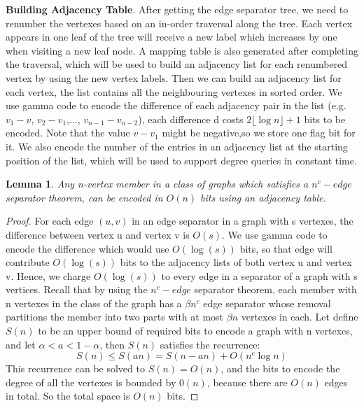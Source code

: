 \documentclass[12pt,glossary]{dalthesis}
\newtheorem{lemma}[theorem]{Lemma}
\begin{document}
\textbf{Building Adjacency Table}. After getting the edge separator tree, we need to renumber the vertexes based on an in-order traversal along the tree. Each vertex appears in one leaf of the tree will receive a new label which increases by one when visiting a new leaf node. A mapping table is also generated after completing the traversal, which will be used to build an adjacency list for each renumbered vertex by using the new vertex labels. Then we can build an adjacency list for each vertex, the list contains all the neighbouring vertexes in sorted order. We use gamma code to encode the difference of each adjacency pair in the list (e.g. $v_{1} - v$, $v_{2} - v_{1}$,..., $v_{n-1} - v_{n-2}$), each difference d costs $2\lfloor \log n \rfloor + 1$ bits to be encoded. Note that the value $v -v_{1}$ might be negative,so we store one flag bit for it. We also encode the number of the entries in an adjacency list at the starting position of the list, which will be used to support degree queries in constant time.

\begin{lemma}
Any n-vertex member in a class of graphs which satisfies a $n^{c}-edge$ separator
theorem, can be encoded in $O(n)$ bits using an adjacency table.
\end{lemma}
 
\begin{proof}
For each edge $(u, v)$ in an edge separator in a graph with s vertexes, the difference
between vertex u and vertex v is $O(s)$. We use gamma code to encode the difference which would use $O(\log (s))$ bits, so that edge will contribute $O(\log (s))$ bits to the adjacency lists of both vertex u and vertex v. Hence, we charge $O(\log (s))$ to every edge in a separator of a graph with s vertices. Recall that by using the $n^{c}- edge$ separator theorem, each member with n vertexes in the class of the graph has a $\beta n^{c}$ edge separator whose removal partitions the member into two parts with at most $\beta n$ vertexes in each. Let define $S(n)$ to be an upper bound of required bits to encode a graph with n vertexes, and let $\alpha < a < 1 - \alpha $, then $S(n)$ satisfies the recurrence:
\[ S(n) \leq S(an) = S(n-an) + O(n^{c} \log n) \]
This recurrence can be solved to $S(n) = O(n)$, and the bits to encode the degree of all the vertexes is bounded by $0(n)$, because there are $O(n)$ edges in total. So the total space is $O(n)$ bits.
\end{proof}
\end{document}

